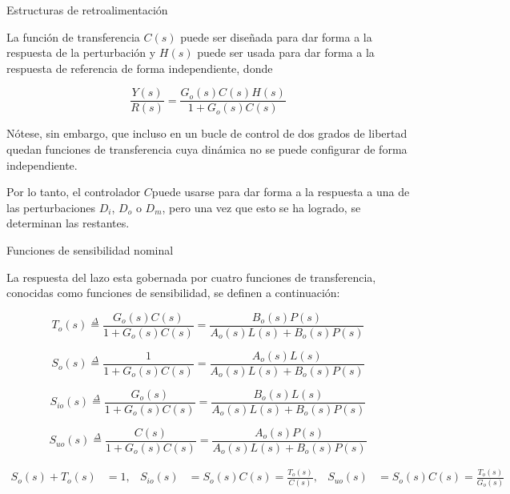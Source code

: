\documentclass{beamer}
\begin{document}
\begin{frame}{Estructuras de retroalimentación}
\begin{justify}
\small

La función de transferencia $C(s)$ puede ser diseñada para dar forma a la respuesta de la perturbación y $H(s)$ puede ser usada para dar forma a la respuesta de referencia de forma independiente, donde

\vspace{0.3cm}
\[\frac{Y(s)}{R(s)}=\frac{G_o(s)C(s)H(s)}{1+G_o(s)C(s)}\]

\vspace{0.3cm}
Nótese, sin embargo, que incluso en un bucle de control de dos grados de libertad quedan funciones de transferencia cuya dinámica no se puede configurar de forma independiente.

\vspace{0.3cm}
Por lo tanto, el controlador $C $puede usarse para dar forma a la respuesta a una de las perturbaciones $D_i$, $D_o$ o $D_m$, pero una vez que esto se ha logrado, se determinan las restantes.
\end{justify}
\end{frame}


\begin{frame}{Funciones de sensibilidad nominal}
\begin{justify}
\small

La respuesta del lazo esta gobernada por cuatro funciones de transferencia, conocidas como funciones de sensibilidad, se definen a continuación:

{\footnotesize
\begin{equation} \label{sensibilidad1}
    T_o (s) \stackrel{\Delta}{=} \frac{G_o(s)C(s)}{1+G_o(s)C(s)} = \frac{B_o(s)P(s)}{A_o(s)L(s) + B_o(s)P(s)}
\end{equation}

\begin{equation}\label{sensibilidad2}
    S_o (s) \stackrel{\Delta}{=} \frac{1}{1+G_o(s)C(s)} = \frac{A_o(s)L(s)}{A_o(s)L(s) + B_o(s)P(s)}
\end{equation}

\begin{equation}\label{sensibilidad3}
    S_{io} (s) \stackrel{\Delta}{=} \frac{G_o(s)}{1+G_o(s)C(s)} = \frac{B_o(s)L(s)}{A_o(s)L(s) + B_o(s)P(s)}
\end{equation}

\begin{equation}\label{sensibilidad4}
    S_{uo} (s) \stackrel{\Delta}{=} \frac{C(s)}{1+G_o(s)C(s)} = \frac{A_o(s)P(s)}{A_o(s)L(s) + B_o(s)P(s)}
\end{equation}

\begin{align*}
    S_o (s) + T_o(s) &= 1, & S_{io} (s) &= S_o(s)C(s) = \frac{T_o(s)}{C(s)}, & S_{uo} (s) &= S_o(s)C(s) = \frac{T_o(s)}{G_o(s)}
\end{align*}

}
\end{justify}
\end{frame}
\end{document}
